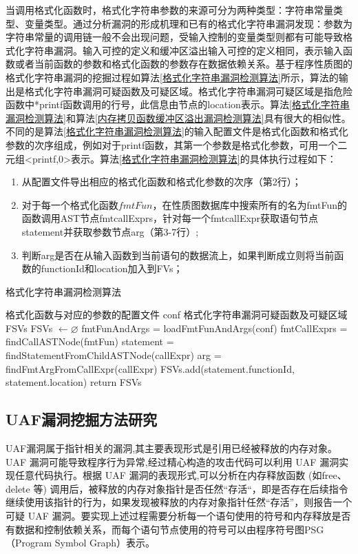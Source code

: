 {当调用格式化函数时，格式化字符串参数的来源可分为两种类型：字符串常量类型、变量类型。通过分析漏洞的形成机理和已有的格式化字符串漏洞发现：参数为字符串常量的调用链一般不会出现问题，受输入控制的变量类型则都有可能导致格式化字符串漏洞。输入可控的定义和缓冲区溢出输入可控的定义相同，表示输入函数或者当前函数的参数和格式化函数的参数存在数据依赖关系。基于程序性质图的格式化字符串漏洞的挖掘过程如算法\ref{格式化字符串漏洞检测算法}所示，算法的输出是格式化字符串漏洞可疑函数及可疑区域。格式化字符串漏洞可疑区域是指危险函数中*printf函数调用的行号，此信息由节点的location表示。算法\ref{格式化字符串漏洞检测算法}和算法\ref{内存拷贝函数缓冲区溢出漏洞检测算法}具有很大的相似性。不同的是算法\ref{格式化字符串漏洞检测算法}的输入配置文件是格式化函数和格式化参数的次序组成，例如对于printf函数，其第一个参数是格式化参数，可用一个二元组<printf,0>表示。算法\ref{格式化字符串漏洞检测算法}的具体执行过程如下：
\begin{enumerate}[(1)]
\item 从配置文件导出相应的格式化函数和格式化参数的次序（第2行）；
\item 对于每一个格式化函数$fmtFun$，在性质图数据库中搜索所有的名为fmtFun的函数调用AST节点fmtcallExprs，针对每一个fmtcallExpr获取语句节点statement并获取参数节点arg（第3-7行）;
\item 
判断arg是否在从输入函数到当前语句的数据流上，如果判断成立则将当前函数的functionId和location加入到FVs；
\end{enumerate}

\begin{algorithm}
	\renewcommand{\algorithmicrequire}{\textbf{Input:}}
	\renewcommand{\algorithmicensure}{\textbf{Output:}}
	\caption{格式化字符串漏洞检测算法}
	\label{格式化字符串漏洞检测算法}
	\begin{algorithmic}[1]
		\REQUIRE 格式化函数与对应的参数的配置文件 conf
		\ENSURE 格式化字符串漏洞可疑函数及可疑区域 FSVs
		\STATE FSVs $\leftarrow \varnothing$
		\STATE fmtFunAndArgs = loadFmtFunAndArgs(conf)
			\STATE fmtCallExprs = findCallASTNode(fmtFun)
				\STATE statement = findStatementFromChildASTNode(callExpr)
				\STATE arg = findFmtArgFromCallExpr(callExpr)
					\STATE FSVs.add(statement.functionId, statement.location)
				\ENDIF
			\ENDFOR
		\ENDFOR	
	\STATE return FSVs	
	\end{algorithmic}
\end{algorithm}

\subsection{UAF漏洞挖掘方法研究}
UAF漏洞属于指针相关的漏洞,其主要表现形式是引用已经被释放的内存对象。UAF 漏洞可能导致程序行为异常,经过精心构造的攻击代码可以利用 UAF 漏洞实现任意代码执行。根据 UAF 漏洞的表现形式,可以分析在内存释放函数 (如free、delete 等) 调用后，被释放的内存对象指针是否任然“存活“，即是否存在后续指令继续使用该指针的行为，如果发现被释放的内存对象指针任然“存活”，则报告一个可疑 UAF 漏洞。要实现上述过程需要分析每一个语句使用的符号和内存释放是否有数据和控制依赖关系，而每个语句节点使用的符号可以由程序符号图PSG（Program Symbol Graph）表示。

}
